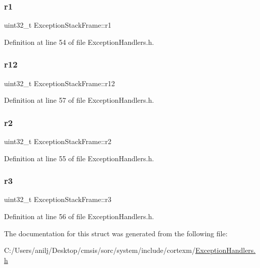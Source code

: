 \mbox{\label{struct_exception_stack_frame_a4ca6f1d249bae98cc5fd549defd36740}} 
\subsubsection{\texorpdfstring{r1}{r1}}
{\footnotesize\ttfamily uint32\+\_\+t Exception\+Stack\+Frame\+::r1}



Definition at line 54 of file Exception\+Handlers.\+h.

\mbox{\label{struct_exception_stack_frame_ae10879ca5d9e29cb102fdd287a6a6fdc}} 
\subsubsection{\texorpdfstring{r12}{r12}}
{\footnotesize\ttfamily uint32\+\_\+t Exception\+Stack\+Frame\+::r12}



Definition at line 57 of file Exception\+Handlers.\+h.

\mbox{\label{struct_exception_stack_frame_a21bcab1471ce8d7389f81bbc7fb5bbc6}} 
\subsubsection{\texorpdfstring{r2}{r2}}
{\footnotesize\ttfamily uint32\+\_\+t Exception\+Stack\+Frame\+::r2}



Definition at line 55 of file Exception\+Handlers.\+h.

\mbox{\label{struct_exception_stack_frame_a980339f7a21c9b31de49da6b37c80c91}} 
\subsubsection{\texorpdfstring{r3}{r3}}
{\footnotesize\ttfamily uint32\+\_\+t Exception\+Stack\+Frame\+::r3}



Definition at line 56 of file Exception\+Handlers.\+h.



The documentation for this struct was generated from the following file\+:\begin{DoxyCompactItemize}
\item 
C\+:/\+Users/anilj/\+Desktop/cmsis/sorc/system/include/cortexm/\hyperlink{_exception_handlers_8h}{Exception\+Handlers.\+h}\end{DoxyCompactItemize}
